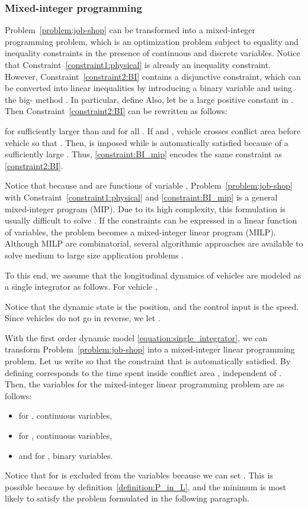 \documentclass{sig-alternate}
\begin{document}
\subsubsection{Mixed-integer programming}
Problem~\ref{problem:job-shop} can be transformed into a mixed-integer programming problem, which is an optimization problem subject to equality and inequality constraints in the presence of continuous and discrete variables. Notice that Constraint~\eqref{constraint1:physical} is already an inequality constraint. However, Constraint~\eqref{constraint2:BI} contains a disjunctive constraint, which can be converted into linear inequalities by introducing a binary variable  and using the big- method \cite{grossmann_generalized_2012}. In particular, define 
Also, let  be a large positive constant in . Then Constraint~\eqref{constraint2:BI} can be rewritten as follows:

for  sufficiently larger than  and  for all . If  and , vehicle  crosses conflict area  before vehicle  so that . Then,  is imposed while  is automatically satisfied because of a sufficiently large . Thus, \eqref{constraint:BI_mip} encodes the same constraint as \eqref{constraint2:BI}.

Notice that because  and  are functions of variable , Problem~\ref{problem:job-shop} with Constraint~\eqref{constraint1:physical} and \eqref{constraint:BI_mip} is a general mixed-integer program (MIP). Due to its high complexity, this formulation is usually difficult to solve \cite{bussieck_minlp_2010}. If the constraints can be expressed in a linear function of variables, the problem becomes a mixed-integer linear program (MILP). Although MILP are combinatorial, several algorithmic approaches are available to solve medium to large size application problems \cite{floudas1995nonlinear}.


To this end, we assume that the longitudinal dynamics of vehicles are modeled as a single integrator as follows. For vehicle ,

Notice that the dynamic state  is the position, and the control input  is the speed. Since vehicles do not go in reverse, we let .  

With the first order dynamic model \eqref{equation:single_integrator}, we can transform Problem~\ref{problem:job-shop} into a mixed-integer linear programming problem.
Let us write  so that the constraint that  is automatically satisfied. By defining   corresponds to the time spent inside conflict area , independent of . Then, the variables for the mixed-integer linear programming problem are as follows:
\begin{itemize}
	\item  for , continuous variables,
	\item  for , continuous variables,
	\item  and  for , binary variables.
\end{itemize}
Notice that  for  is excluded from the variables because we can set . This is possible because  by definition~\eqref{definition:P_in_L}, and  the minimum  is most likely to satisfy the problem formulated in the following paragraph.
\end{document}
